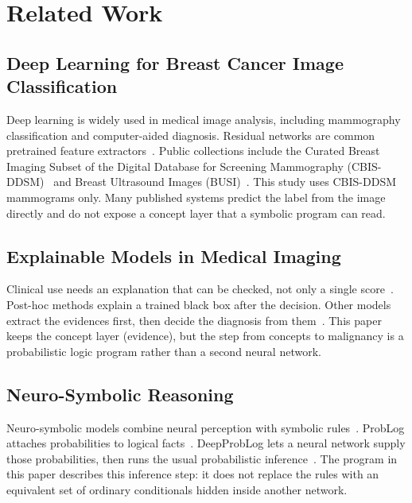 \section{Related Work}
\label{sec:related}

\subsection{Deep Learning for Breast Cancer Image Classification}
Deep learning is widely used in medical image analysis, including mammography classification and computer-aided diagnosis. Residual networks are common pretrained feature extractors~\cite{he2016resnet}. Public collections include the Curated Breast Imaging Subset of the Digital Database for Screening Mammography (CBIS-DDSM)~\cite{lee2017cbis} and Breast Ultrasound Images (BUSI)~\cite{aldhabyani2020busi}. This study uses CBIS-DDSM mammograms only. Many published systems predict the label from the image directly and do not expose a concept layer that a symbolic program can read.

\subsection{Explainable Models in Medical Imaging}
Clinical use needs an explanation that can be checked, not only a single score~\cite{vandervelden2022xai,rudin2019stop}. Post-hoc methods explain a trained black box after the decision.  Other models extract the evidences first, then decide the diagnosis from them~\cite{koh2020concept}. This paper keeps the concept layer (evidence), but the step from concepts to malignancy is a probabilistic logic program rather than a second neural network.

\subsection{Neuro-Symbolic Reasoning}
Neuro-symbolic models combine neural perception with symbolic rules~\cite{garcez2002neural,garcez2023neurosymbolic}. ProbLog attaches probabilities to logical facts~\cite{deraedt2007problog}. DeepProbLog lets a neural network supply those probabilities, then runs the usual probabilistic inference~\cite{manhaeve2018deepproblog,manhaeve2021neural}. The program in this paper describes this inference step: it does not replace the rules with an equivalent set of ordinary conditionals hidden inside another network.
